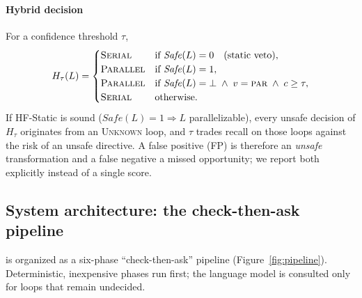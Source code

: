 \paragraph{Hybrid decision} For a confidence threshold $\tau$,
\begin{equation}
\label{eq:hybrid}
H_\tau(L) =
\begin{cases}
\textsc{Serial}   & \text{if } \mathit{Safe}(L) = 0 \quad\text{(static veto)},\\
\textsc{Parallel} & \text{if } \mathit{Safe}(L) = 1,\\
\textsc{Parallel} & \text{if } \mathit{Safe}(L) = \bot \;\wedge\; v = \textsc{par} \;\wedge\; c \ge \tau,\\
\textsc{Serial}   & \text{otherwise.}
\end{cases}
\end{equation}
If HF-Static is sound ($\mathit{Safe}(L)=1 \Rightarrow L$ parallelizable), every unsafe decision of $H_\tau$ originates from an \textsc{Unknown} loop, and $\tau$ trades recall on those loops against the risk of an unsafe directive. A false positive (FP) is therefore an \emph{unsafe} transformation and a false negative a missed opportunity; we report both explicitly instead of a single score.

\subsection{System architecture: the check-then-ask pipeline}
\SystemName{} is organized as a six-phase ``check-then-ask'' pipeline (Figure~\ref{fig:pipeline}). Deterministic, inexpensive phases run first; the language model is consulted only for loops that remain undecided.


